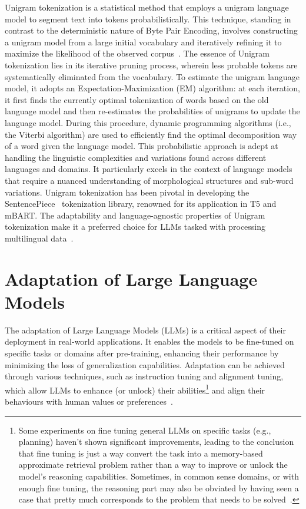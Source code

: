Unigram tokenization is a statistical method that employs a unigram language model to segment text into tokens probabilistically.
This technique, standing in contrast to the deterministic nature of Byte Pair Encoding, involves constructing a unigram model from a large initial vocabulary and iteratively refining it to maximize the likelihood of the observed corpus~\cite{kudo2018sentencepiece}.
The essence of Unigram tokenization lies in its iterative pruning process, wherein less probable tokens are systematically eliminated from the vocabulary.
To estimate the unigram language model, it adopts an Expectation-Maximization (EM) algorithm: at each iteration, it first finds the currently optimal tokenization of words based on the old language model and then re-estimates the probabilities of unigrams to update the language model.
During this procedure, dynamic programming algorithms (i.e., the Viterbi algorithm) are used to efficiently find the optimal decomposition way of a word given the language model\cite{survey}.
This probabilistic approach is adept at handling the linguistic complexities and variations found across different languages and domains.
It particularly excels in the context of language models that require a nuanced understanding of morphological structures and sub-word variations.
Unigram tokenization has been pivotal in developing the SentencePiece~\cite{kudo2018sentencepiece} tokenization library, renowned for its application in T5 and mBART\@.
The adaptability and language-agnostic properties of Unigram tokenization make it a preferred choice for LLMs tasked with processing multilingual data~\cite{kudo2018sentencepiece}.

\section{Adaptation of Large Language Models}
\label{sec:adaptation-of-llms}

The adaptation of Large Language Models (LLMs) is a critical aspect of their deployment in real-world applications.
It enables the models to be fine-tuned on specific tasks or domains after pre-training, enhancing their performance by minimizing the loss of generalization capabilities.
Adaptation can be achieved through various techniques, such as instruction tuning and alignment tuning, which allow LLMs to enhance (or unlock) their abilities\footnote{
	Some experiments on fine tuning general LLMs on specific tasks (e.g., planning) haven't shown significant improvements, leading to the conclusion that fine tuning is just a way convert the task into a memory-based approximate retrieval problem rather than a way to improve or unlock the model's reasoning capabilities. Sometimes, in common sense domains, or with enough fine tuning, the reasoning part may also be obviated by having seen a case that pretty much corresponds to the problem that needs to be solved~\cite{subbarao2024canlanguagemodelsreasonplan}.
} and align their behaviours with human values or preferences~\cite{survey}.

